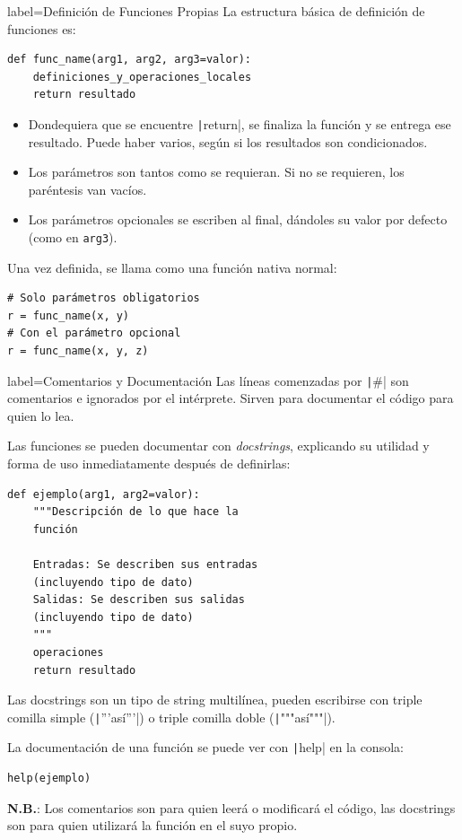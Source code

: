 \begin{contentbox}{label=Definición de Funciones Propias}
    La estructura básica de definición de funciones es:
\begin{verbatim}
def func_name(arg1, arg2, arg3=valor):
    definiciones_y_operaciones_locales
    return resultado
\end{verbatim}

    \begin{itemize}
        \item Dondequiera que se encuentre \texttt|return|, se finaliza la función y se entrega ese resultado. Puede haber varios, según si los resultados son condicionados.
        \item Los parámetros son tantos como se requieran. Si no se requieren, los paréntesis van vacíos.
        \item Los parámetros opcionales se escriben al final, dándoles su valor por defecto (como en \verb|arg3|).%
    \end{itemize}

    Una vez definida, se llama como una función nativa normal:
\begin{verbatim}
# Solo parámetros obligatorios
r = func_name(x, y)
# Con el parámetro opcional
r = func_name(x, y, z)
\end{verbatim}
\end{contentbox}

\begin{contentbox}{label=Comentarios y Documentación}
    Las líneas comenzadas por \texttt|#| son comentarios e ignorados por el intérprete. Sirven para documentar el código para quien lo lea.
    
    Las funciones se pueden documentar con \textit{docstrings}, explicando su utilidad y forma de uso inmediatamente después de definirlas:
\begin{verbatim}
def ejemplo(arg1, arg2=valor):
    """Descripción de lo que hace la
    función
    
    Entradas: Se describen sus entradas 
    (incluyendo tipo de dato)
    Salidas: Se describen sus salidas 
    (incluyendo tipo de dato)
    """
    operaciones
    return resultado
\end{verbatim}

    Las docstrings son un tipo de string multilínea, pueden escribirse con triple comilla simple (\texttt|'''así'''|) o triple comilla doble (\texttt|"""así"""|).

    La documentación de una función se puede ver con \texttt|help| en la consola:
\begin{verbatim}
help(ejemplo)
\end{verbatim}
    
    \textbf{N.B.}: Los comentarios son para quien leerá o modificará el código, las docstrings son para quien utilizará la función en el suyo propio.
\end{contentbox}

